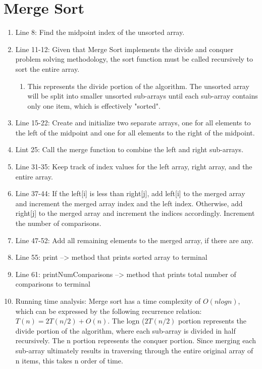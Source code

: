 \documentclass[letterpaper, 10pt,DIV=13]{scrartcl}
\numberwithin{equation}{section} %
\numberwithin{figure}{section} %
\numberwithin{table}{section} %
\begin{document}
\section{Merge Sort}
\begin{enumerate}
    \item Line 8: Find the midpoint index of the unsorted array.
    \item Line 11-12: Given that Merge Sort implements the divide and conquer problem solving methodology, the sort function must be called recursively to sort the entire array.
    \begin{enumerate}
        \item This represents the divide portion of the algorithm. The unsorted array will be split into smaller unsorted sub-arrays until each sub-array contains only one item, which is effectively "sorted". 
    \end{enumerate}
    \item Line 15-22: Create and initialize two separate arrays, one for all elements to the left of the midpoint and one for all elements to the right of the midpoint.
    \item Lint 25: Call the merge function to combine the left and right sub-arrays.
    \item Line 31-35: Keep track of index values for the left array, right array, and the entire array.
    \item Line 37-44: If the left[i] is less than right[j], add left[i] to the merged array and increment the merged array index and the left index. Otherwise, add right[j] to the merged array and increment the indices accordingly. Increment the number of comparisons.
    \item Line 47-52: Add all remaining elements to the merged array, if there are any.
    \item Line 55: print --> method that prints sorted array to terminal
    \item Line 61: printNumComparisons --> method that prints total number of comparisons to terminal
    \item Running time analysis: Merge sort has a time complexity of $O(nlogn)$, which can be expressed by the following recurrence relation: $T(n) = 2T(n/2) + O(n)$. The logn ($2T(n/2)$ portion represents the divide portion of the algorithm, where each sub-array is divided in half recursively. The n portion represents the conquer portion. Since merging each sub-array ultimately results in traversing through the entire original array of n items, this takes n order of time.
\end{enumerate}
\end{document}
